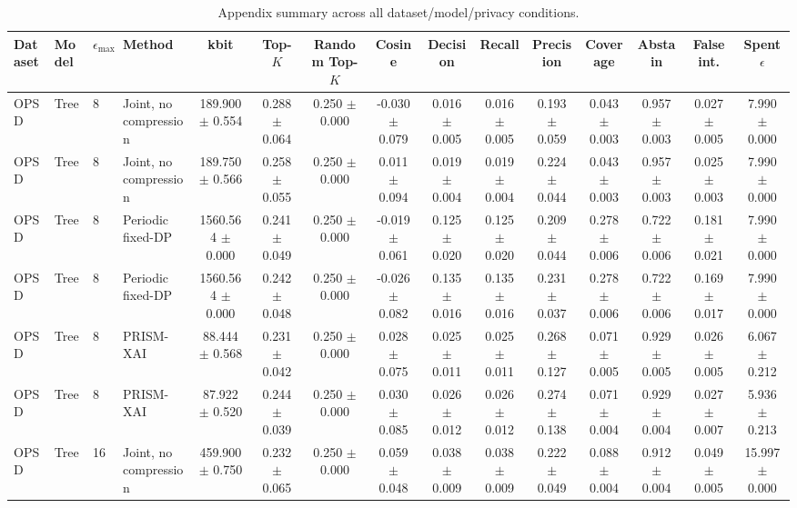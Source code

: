 \begin{table}[t]
\caption{Appendix summary across all dataset/model/privacy conditions.}
\label{tab:appendix-conditions}
\centering
\scriptsize
\setlength{\tabcolsep}{2.5pt}
\begin{tabular}{llllccccccccccc}
\toprule
Dataset & Model & $\epsilon_{\max}$ & Method & kbit & Top-$K$ & Random Top-$K$ & Cosine & Decision & Recall & Precision & Coverage & Abstain & False int. & Spent $\epsilon$ \\
\midrule
OPSD & Tree & 8 & Joint, no compression & 189.900 $\pm$ 0.554 & 0.288 $\pm$ 0.064 & 0.250 $\pm$ 0.000 & -0.030 $\pm$ 0.079 & 0.016 $\pm$ 0.005 & 0.016 $\pm$ 0.005 & 0.193 $\pm$ 0.059 & 0.043 $\pm$ 0.003 & 0.957 $\pm$ 0.003 & 0.027 $\pm$ 0.005 & 7.990 $\pm$ 0.000 \\
OPSD & Tree & 8 & Joint, no compression & 189.750 $\pm$ 0.566 & 0.258 $\pm$ 0.055 & 0.250 $\pm$ 0.000 & 0.011 $\pm$ 0.094 & 0.019 $\pm$ 0.004 & 0.019 $\pm$ 0.004 & 0.224 $\pm$ 0.044 & 0.043 $\pm$ 0.003 & 0.957 $\pm$ 0.003 & 0.025 $\pm$ 0.003 & 7.990 $\pm$ 0.000 \\
OPSD & Tree & 8 & Periodic fixed-DP & 1560.564 $\pm$ 0.000 & 0.241 $\pm$ 0.049 & 0.250 $\pm$ 0.000 & -0.019 $\pm$ 0.061 & 0.125 $\pm$ 0.020 & 0.125 $\pm$ 0.020 & 0.209 $\pm$ 0.044 & 0.278 $\pm$ 0.006 & 0.722 $\pm$ 0.006 & 0.181 $\pm$ 0.021 & 7.990 $\pm$ 0.000 \\
OPSD & Tree & 8 & Periodic fixed-DP & 1560.564 $\pm$ 0.000 & 0.242 $\pm$ 0.048 & 0.250 $\pm$ 0.000 & -0.026 $\pm$ 0.082 & 0.135 $\pm$ 0.016 & 0.135 $\pm$ 0.016 & 0.231 $\pm$ 0.037 & 0.278 $\pm$ 0.006 & 0.722 $\pm$ 0.006 & 0.169 $\pm$ 0.017 & 7.990 $\pm$ 0.000 \\
OPSD & Tree & 8 & PRISM-XAI & 88.444 $\pm$ 0.568 & 0.231 $\pm$ 0.042 & 0.250 $\pm$ 0.000 & 0.028 $\pm$ 0.075 & 0.025 $\pm$ 0.011 & 0.025 $\pm$ 0.011 & 0.268 $\pm$ 0.127 & 0.071 $\pm$ 0.005 & 0.929 $\pm$ 0.005 & 0.026 $\pm$ 0.005 & 6.067 $\pm$ 0.212 \\
OPSD & Tree & 8 & PRISM-XAI & 87.922 $\pm$ 0.520 & 0.244 $\pm$ 0.039 & 0.250 $\pm$ 0.000 & 0.030 $\pm$ 0.085 & 0.026 $\pm$ 0.012 & 0.026 $\pm$ 0.012 & 0.274 $\pm$ 0.138 & 0.071 $\pm$ 0.004 & 0.929 $\pm$ 0.004 & 0.027 $\pm$ 0.007 & 5.936 $\pm$ 0.213 \\
OPSD & Tree & 16 & Joint, no compression & 459.900 $\pm$ 0.750 & 0.232 $\pm$ 0.065 & 0.250 $\pm$ 0.000 & 0.059 $\pm$ 0.048 & 0.038 $\pm$ 0.009 & 0.038 $\pm$ 0.009 & 0.222 $\pm$ 0.049 & 0.088 $\pm$ 0.004 & 0.912 $\pm$ 0.004 & 0.049 $\pm$ 0.005 & 15.997 $\pm$ 0.000 \\

\end{tabular}
\end{table}
